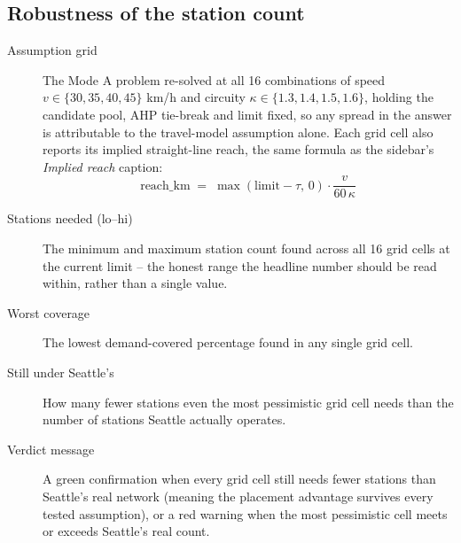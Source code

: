\documentclass[11pt]{article}
\begin{document}
\subsection{Robustness of the station count}
\begin{description}
  \item[Assumption grid] The Mode A problem re-solved at all 16 combinations
    of speed $v \in \{30, 35, 40, 45\}$ km/h and circuity
    $\kappa \in \{1.3, 1.4, 1.5, 1.6\}$, holding the candidate pool, AHP
    tie-break and limit fixed, so any spread in the answer is attributable to
    the travel-model assumption alone. Each grid cell also reports its
    implied straight-line reach, the same formula as the sidebar's
    \emph{Implied reach} caption:
    \[
      \text{reach\_km} \;=\; \max(\text{limit} - \tau,\,0)\cdot\frac{v}{60\,\kappa}
    \]
  \item[Stations needed (lo--hi)] The minimum and maximum station count found
    across all 16 grid cells at the current limit -- the honest range the
    headline number should be read within, rather than a single value.
  \item[Worst coverage] The lowest demand-covered percentage found in any
    single grid cell.
  \item[Still under Seattle's] How many fewer stations even the most
    pessimistic grid cell needs than the number of stations Seattle actually
    operates.
  \item[Verdict message] A green confirmation when every grid cell still
    needs fewer stations than Seattle's real network (meaning the placement
    advantage survives every tested assumption), or a red warning when the
    most pessimistic cell meets or exceeds Seattle's real count.
\end{description}
\end{document}
